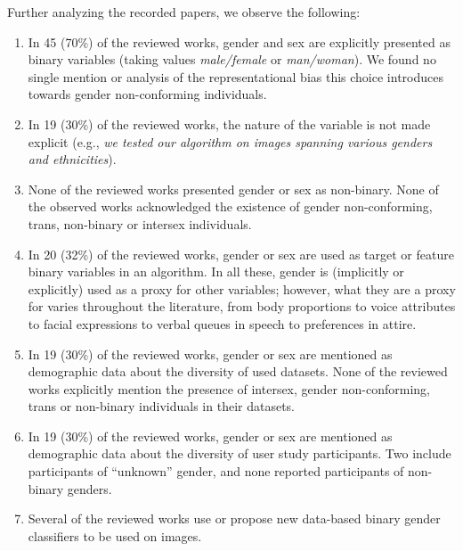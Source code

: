 \documentclass[nonacm,sigconf,review,balance=false]{acmart}
\begin{document}
Further analyzing the recorded papers, we observe the following:

\begin{enumerate}[O1.]
    \item In 45 (70\%) of the reviewed works, gender and sex are explicitly presented as binary variables (taking values \emph{male/female} or \emph{man/woman}). We found no single mention or analysis of the representational bias this choice introduces towards gender non-conforming individuals.
    \item In 19 (30\%) of the reviewed works, the nature of the variable is not made explicit (e.g., \emph{we tested our algorithm on images spanning various genders and ethnicities}).
    \item None of the reviewed works presented gender or sex as non-binary. None of the observed works acknowledged the existence of gender non-conforming, trans, non-binary or intersex individuals.
    \item In 20 (32\%) of the reviewed works, gender or sex are used as target or feature binary variables in an algorithm. In all these, gender is (implicitly or explicitly) used as a proxy for other variables; however, what they are a proxy for varies throughout the literature, from body proportions to voice attributes to facial expressions to verbal queues in speech to preferences in attire.
    \item In 19 (30\%) of the reviewed works, gender or sex are mentioned as demographic data about the diversity of used datasets. None of the reviewed works explicitly mention the presence of intersex, gender non-conforming, trans or non-binary individuals in their datasets.
    \item In 19 (30\%) of the reviewed works, gender or sex are mentioned as demographic data about the diversity of user study participants. Two include participants of ``unknown'' gender, and none reported participants of non-binary genders.
    \item Several of the reviewed works use or propose new data-based binary gender classifiers to be used on images.
\end{enumerate}
\end{document}
